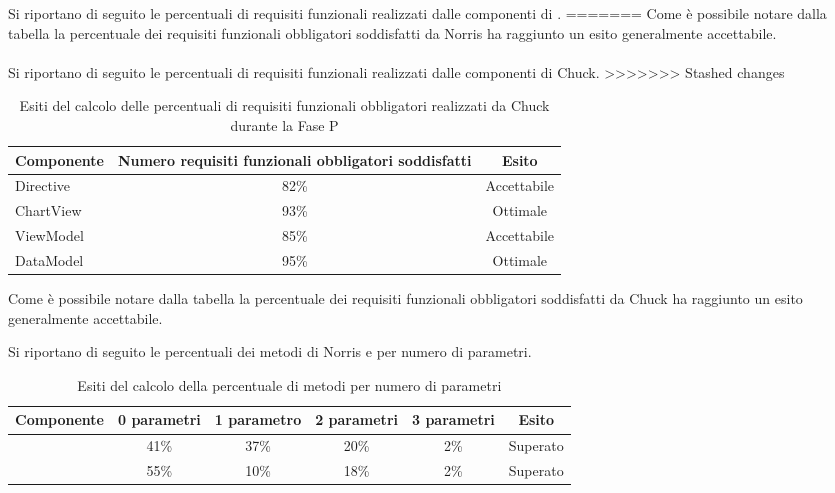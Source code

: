Si riportano di seguito le percentuali di requisiti funzionali realizzati dalle componenti di .
=======
Come è possibile notare dalla tabella la percentuale dei requisiti funzionali obbligatori soddisfatti da Norris ha raggiunto un esito generalmente accettabile. 
\\ \\
Si riportano di seguito le percentuali di requisiti funzionali realizzati dalle componenti di Chuck.
>>>>>>> Stashed changes
\begin{table}[H]
	\centering
		\begin{tabu}{| l | c | c |}
			\hline
			Componente	& Numero requisiti funzionali obbligatori soddisfatti	& Esito		\\ \hline \hline
			Directive	& 82\% 	& Accettabile  \\ \hline
			ChartView  & 	93\%	& Ottimale  \\ \hline
			ViewModel  & 	85\%	& Accettabile  \\ \hline
			DataModel  & 	95\%	& Ottimale  \\ \hline
		\end{tabu}
	\caption{Esiti del calcolo delle percentuali di requisiti funzionali obbligatori realizzati da Chuck durante la Fase P}
\end{table}
Come è possibile notare dalla tabella la percentuale dei requisiti funzionali obbligatori soddisfatti da Chuck ha raggiunto un esito generalmente accettabile.

Si riportano di seguito le percentuali dei metodi di Norris e  per numero di parametri.
\begin{table}[H]
	\centering
		\begin{tabu}{| l | c | c | c | c | c |}
			\hline
			Componente	& 0 parametri & 1 parametro & 2 parametri & 3 parametri & Esito		\\ \hline \hline
				& 41\% & 37\% & 20\% & 2\%	& Superato  \\ \hline
			  & 55\% & 10\% & 18\% & 2\%	& Superato  \\ \hline
		\end{tabu}
	\caption{Esiti del calcolo della percentuale di metodi per numero di parametri}
\end{table}



